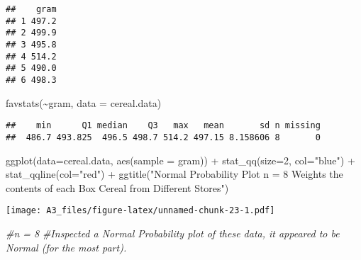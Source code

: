 \documentclass[
]{article}
\newenvironment{Shaded}{\begin{snugshade}}{\end{snugshade}}
\newcommand{\AttributeTok}[1]{\textcolor[rgb]{0.77,0.63,0.00}{#1}}
\newcommand{\CommentTok}[1]{\textcolor[rgb]{0.56,0.35,0.01}{\textit{#1}}}
\newcommand{\DecValTok}[1]{\textcolor[rgb]{0.00,0.00,0.81}{#1}}
\newcommand{\FunctionTok}[1]{\textcolor[rgb]{0.00,0.00,0.00}{#1}}
\newcommand{\NormalTok}[1]{#1}
\newcommand{\SpecialCharTok}[1]{\textcolor[rgb]{0.00,0.00,0.00}{#1}}
\newcommand{\StringTok}[1]{\textcolor[rgb]{0.31,0.60,0.02}{#1}}
\begin{document}
\begin{verbatim}
##    gram
## 1 497.2
## 2 499.9
## 3 495.8
## 4 514.2
## 5 490.0
## 6 498.3
\end{verbatim}

\begin{Shaded}
\begin{Highlighting}[]
\FunctionTok{favstats}\NormalTok{(}\SpecialCharTok{\textasciitilde{}}\NormalTok{gram, }\AttributeTok{data =}\NormalTok{ cereal.data)}
\end{Highlighting}
\end{Shaded}

\begin{verbatim}
##    min      Q1 median    Q3   max   mean       sd n missing
##  486.7 493.825  496.5 498.7 514.2 497.15 8.158606 8       0
\end{verbatim}

\begin{Shaded}
\begin{Highlighting}[]
\FunctionTok{ggplot}\NormalTok{(}\AttributeTok{data=}\NormalTok{cereal.data, }\FunctionTok{aes}\NormalTok{(}\AttributeTok{sample =}\NormalTok{ gram)) }\SpecialCharTok{+} \FunctionTok{stat\_qq}\NormalTok{(}\AttributeTok{size=}\DecValTok{2}\NormalTok{, }\AttributeTok{col=}\StringTok{"blue"}\NormalTok{) }\SpecialCharTok{+} \FunctionTok{stat\_qqline}\NormalTok{(}\AttributeTok{col=}\StringTok{"red"}\NormalTok{) }\SpecialCharTok{+} \FunctionTok{ggtitle}\NormalTok{(}\StringTok{"Normal Probability Plot n = 8 Weights the contents of each Box Cereal from Different Stores"}\NormalTok{)}
\end{Highlighting}
\end{Shaded}

\texttt{[image: A3\_files/figure-latex/unnamed-chunk-23-1.pdf]}

\begin{Shaded}
\begin{Highlighting}[]
\CommentTok{\#n = 8}
\CommentTok{\#Inspected a Normal Probability plot of these data, it appeared to be Normal (for the most part).}
\end{Highlighting}
\end{Shaded}
\end{document}
